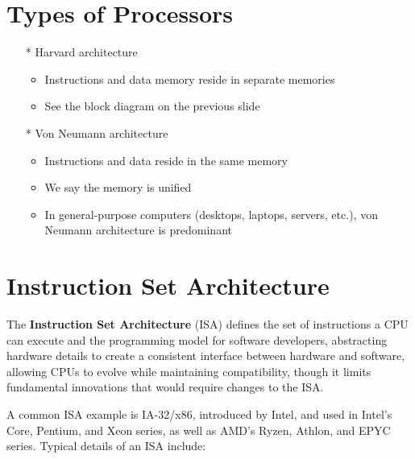 \documentclass[12pt,openany]{book}
\begin{document}
\section{Types of Processors}
\begin{itemize}
    \item[*] Harvard architecture
    \begin{itemize}
        \item Instructions and data memory reside in separate memories
        \item See the block diagram on the previous slide
    \end{itemize}
    \item[*] Von Neumann architecture
    \begin{itemize}
        \item Instructions and data reside in the same memory
        \item We say the memory is unified
        \item In general-purpose computers (desktops, laptops, servers, etc.), von Neumann architecture is predominant
    \end{itemize}
\end{itemize}

\section{Instruction Set Architecture}

The \textbf{Instruction Set Architecture} (ISA) defines the set of instructions a CPU can execute and the programming model for software developers, abstracting hardware details to create a consistent interface between hardware and software, allowing CPUs to evolve while maintaining compatibility, though it limits fundamental innovations that would require changes to the ISA.

A common ISA example is IA-32/x86, introduced by Intel, and used in Intel's Core, Pentium, and Xeon series, as well as AMD's Ryzen, Athlon, and EPYC series. Typical details of an ISA include:
\end{document}
